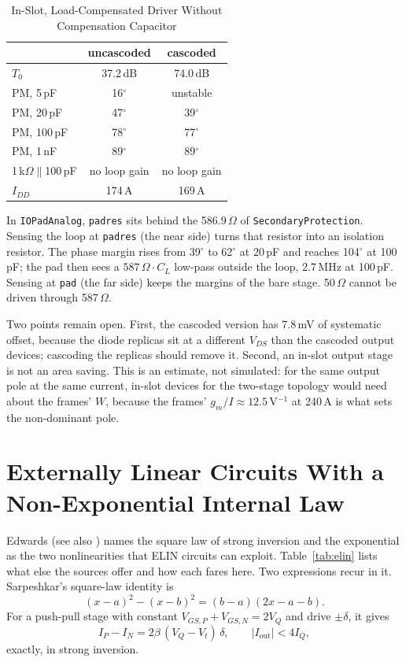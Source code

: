 \documentclass[journal]{IEEEtran}
\newcommand{\cell}[1]{\texttt{#1}}
\newcommand{\uA}{\,\textmu A}
\newcommand{\mV}{\,mV}
\newcommand{\dB}{\,dB}
\newcommand{\MHz}{\,MHz}
\newcommand{\pF}{\,pF}
\newcommand{\Ohm}{\,$\Omega$}
\newcommand{\dg}{$^\circ$}
\newcommand{\RL}{1\,k$\Omega\parallel$100\,pF}
\begin{document}
\begin{table}[!t]
\caption{In-Slot, Load-Compensated Driver Without Compensation Capacitor}
\label{tab:slot}
\centering\footnotesize
\begin{tabular}{@{}lcc@{}}
\toprule
 & uncascoded & cascoded\\
\midrule
$T_0$ & 37.2\dB & 74.0\dB\\
PM, 5\pF & 16\dg & unstable\\
PM, 20\pF & 47\dg & 39\dg\\
PM, 100\pF & 78\dg & 77\dg\\
PM, 1\,nF & 89\dg & 89\dg\\
\RL & no loop gain & no loop gain\\
$I_{DD}$ & 174\uA & 169\uA\\
\bottomrule
\end{tabular}
\end{table}

In \cell{IOPadAnalog}, \cell{padres} sits behind the 586.9\Ohm{} of
\cell{SecondaryProtection}. Sensing the loop at \cell{padres} (the near side) turns that
resistor into an isolation resistor. The phase margin rises from 39\dg{} to 62\dg{} at
20\pF{} and reaches 104\dg{} at 100\pF; the pad then sees a $587\,\Omega\cdot C_L$ low-pass
outside the loop, 2.7\MHz{} at 100\pF. Sensing at \cell{pad} (the far side) keeps the
margins of the bare stage. 50\Ohm{} cannot be driven through 587\Ohm.

Two points remain open. First, the cascoded version has 7.8\mV{} of systematic offset,
because the diode replicas sit at a different $V_{DS}$ than the cascoded output devices;
cascoding the replicas should remove it. Second, an in-slot output stage is not an area
saving. This is an estimate, not simulated: for the same output pole at the same current,
in-slot devices for the two-stage topology would need about the frames' $W$, because the
frames' $g_m/I\approx12.5$\,V$^{-1}$ at 240\uA{} is what sets the non-dominant pole.

\section{Externally Linear Circuits With a Non-Exponential Internal Law}
Edwards \cite[p.~72]{edwards_thesis} (see also \cite{edwards00,edwards98}) names the square law of strong inversion
\cite{wiegerink} and the exponential as the two nonlinearities that ELIN circuits can
exploit. Table~\ref{tab:elin} lists what else the sources offer and how each fares here.
Two expressions recur in it. Sarpeshkar's square-law identity \cite[p.~25]{sarpeshkar97} is
\begin{equation}
(x-a)^2-(x-b)^2=(b-a)(2x-a-b).
\end{equation}
For a push-pull stage with constant $V_{GS,P}+V_{GS,N}=2V_Q$ and drive $\pm\delta$, it gives
\begin{equation}
I_P-I_N=2\beta\,(V_Q-V_t)\,\delta,\qquad |I_\mathrm{out}|<4I_Q ,
\end{equation}
exactly, in strong inversion.
\end{document}
